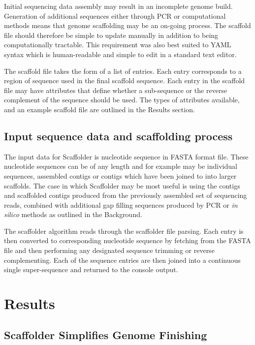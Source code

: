 \documentclass[10pt]{bmc_article}
\newenvironment{bmcformat}{\begin{raggedright}\baselineskip20pt\sloppy\setboolean{publ}{false}}{\end{raggedright}\baselineskip20pt\sloppy}
\begin{document}
\begin{bmcformat}
Initial sequencing data assembly may result in an incomplete genome build.
Generation of additional sequences either through PCR or computational methods
means that genome scaffolding may be an on-going process. The scaffold file
should therefore be simple to update manually in addition to being
computationally tractable. This requirement was also best suited to YAML
syntax which is human-readable and simple to edit in a standard text editor.
\pb

The scaffold file takes the form of a list of entries. Each entry corresponds
to a region of sequence used in the final scaffold sequence. Each entry in the
scaffold file may have attributes that define whether a sub-sequence or the
reverse complement of the sequence should be used. The types of attributes
available, and an example scaffold file are outlined in the Results section.
\pb

\subsection*{Input sequence data and scaffolding process} %

The input data for Scaffolder is nucleotide sequence in FASTA format file.
These nucleotide sequences can be of any length and for example may be
individual sequences, assembled contigs or contigs which have been joined to
into larger scaffolds. The case in which Scaffolder may be most useful is
using the contigs and scaffolded contigs produced from the previously
assembled set of sequencing reads, combined with additional gap filling
sequences produced by PCR or \emph{in silico} methods as outlined in the
Background. \pb

The scaffolder algorithm reads through the scaffolder file parsing. Each entry
is then converted to corresponding nucleotide sequence by fetching from the
FASTA file and then performing any designated sequence trimming or reverse
complementing. Each of the sequence entries are then joined into a continuous
single super-sequence and returned to the console output. \pb

\clearpage

\section*{Results} %

\subsection*{Scaffolder Simplifies Genome Finishing} %


\end{bmcformat}
\end{document}
